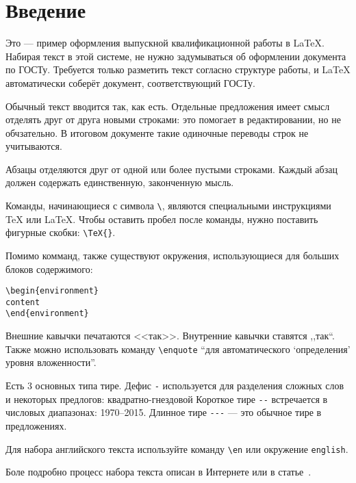 \cleardoublepage
{}
{}
\chapter*{Введение}
\label{chap:introduction}

Это --- пример оформления выпускной квалификационной работы в \LaTeX.
Набирая текст в этой системе, не нужно задумываться об оформлении документа по ГОСТу.
Требуется только разметить текст согласно структуре работы, и \LaTeX{} автоматически соберёт документ, соответствующий ГОСТу.

Обычный текст вводится так, как есть.
Отдельные предложения имеет смысл отделять друг от друга новыми строками: это помогает в редактировании, но не обчзательно.
В итоговом документе такие одиночные переводы строк не учитываются.

Абзацы отделяются друг от одной или более пустыми строками.
Каждый абзац должен содержать единственную, законченную мысль.

Команды, начинающиеся с символа \verb|\|, являются специальными инструкциями \TeX{} или \LaTeX.
Чтобы оставить пробел после команды, нужно поставить фигурные скобки: \verb|\TeX{}|.

Помимо комманд, также существуют окружения, использующиеся для больших блоков содержимого:
\begin{verbatim}
\begin{environment}
content
\end{environment}
\end{verbatim}

Внешние кавычки печатаются <<так>>.
Внутренние кавычки ставятся ,,так``.
Также можно использовать команду \verb|\enquote| \enquote{для автоматического \enquote{определения} уровня вложенности}.

Есть 3 основных типа тире.
Дефис \verb|-| используется для разделения сложных слов и некоторых предлогов: квадратно-гнездовой
Короткое тире \verb|--|  встречается в числовых диапазонах: 1970--2015.
Длинное тире \verb|---|  --- это обычное тире в предложениях.

Для набора английского текста используйте команду \verb|\en| или окружение \verb|english|.

Боле подробно процесс набора текста описан в Интернете или в статье~\cite{oetiker1995not}.
